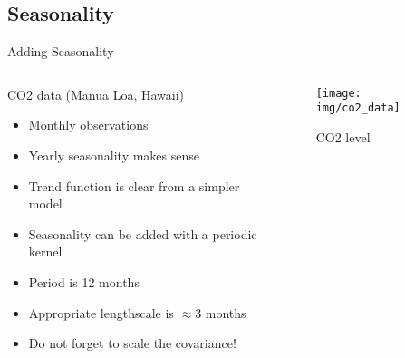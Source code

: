 \documentclass{beamer}
\begin{document}
\subsection{Seasonality}
\begin{frame}{Adding Seasonality}
    \begin{columns}
        \begin{column}{0.5\linewidth}
        CO2 data (Manua Loa, Hawaii)
        \begin{itemize}
            \item Monthly observations
            \item Yearly seasonality makes sense
            \item Trend function is clear from a simpler model
            \item<2-> Seasonality can be added with a periodic kernel
            \item<3-> Period is 12 months
            \item<4-> Appropriate lengthscale is $\approx 3$ months
            \item<5-> Do not forget to scale the covariance!
        \end{itemize}
        
        \end{column}
        \begin{column}{0.5\linewidth}
        \begin{figure}
            \centering
            \texttt{[image: img/co2\_data]}
            \caption{CO2 level}
        \end{figure}
        \end{column}
    \end{columns}
\end{frame}
\end{document}
